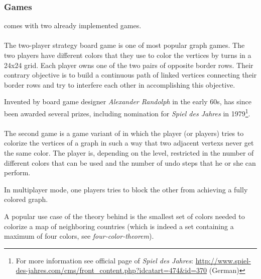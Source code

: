 \subsubsection{Games}
{\graphioli} comes with two already implemented games.\par
\paragraph*{\twixt}
The two-player strategy board game {\twixt} is one of most popular graph games. The two players have different colors that they use to color the vertices by turns in a 24x24 grid. Each player owns one of the two pairs of opposite border rows. Their contrary objective is to build a continuous \gls{path} of linked vertices connecting their border rows and try to interfere each other in accomplishing this objective.\par
Invented by board game designer \emph{Alexander Randolph} in the early 60s, {\twixt} has since been awarded several prizes, including nomination for \emph{Spiel des Jahres} in 1979\footnote{For more information see official page of \emph{Spiel des Jahres}: \url{http://www.spiel-des-jahres.com/cms/front_content.php?idcatart=474&id=370} (German)}.\par
\paragraph*{\graphcoloring}
The second game is a game variant of {\graphcoloring} in which the player (or players) tries to colorize the vertices of a graph in such a way that two \gls{adjacent} \glspl{vertex} never get the same color. The player is, depending on the level, restricted in the number of different colors that can be used and the number of \gls{undo} steps that he or she can perform.\par
In multiplayer mode, one players tries to block the other from achieving a fully colored graph.\par
A popular use case of the theory behind {\graphcoloring} is the smallest set of colors needed to colorize a map of neighboring countries (which is indeed a set containing a maximum of four colors, see \emph{\gls{four-color-theorem}}).\par